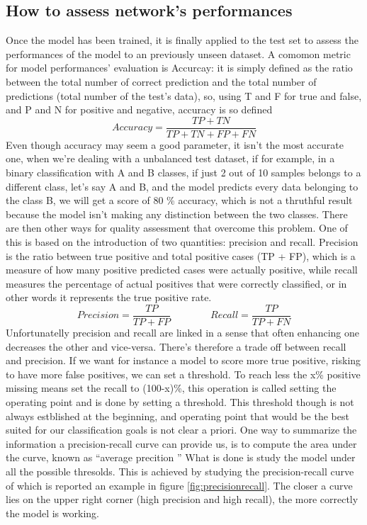 \documentclass[a4paper,11pt]{article}
\begin{document}
\subsection{How to assess network's performances}
Once the model has been trained, it is finally applied to the test set to assess the performances of the model to an previously unseen dataset.
A comomon metric for model performances' evaluation is Accurcay: it is simply defined as the ratio between the total number of correct prediction and the total number of predictions (total number of the test's data), so, using T and F for true and false, and P and N for positive and negative, accuracy is so defined
\begin{equation}
Accuracy = \frac{TP + TN}{TP+TN+FP+FN}
\end{equation}
Even though accuracy may seem a good parameter, it isn't the most accurate one, when we're dealing with a unbalanced test dataset, if for example, in a binary classification with A and B classes, if just 2 out of 10 samples belongs to a different class, let's say A and B, and the model predicts every data belonging to the class B, we will get a score of 80 \% accuracy, which is not a thruthful result because the model isn't making any distinction between the two classes.
There are then other ways for quality assessment that overcome this problem. One of this is based on the introduction of two quantities: precision and recall.
Precision is the ratio between true positive and total positive cases (TP + FP), which is a measure of how many positive predicted cases were actually positive, while recall measures the percentage of actual positives that were correctly classified, or in other words it represents the true positive rate.
\begin{equation}
Precision = \frac{TP}{TP+FP} \qquad \qquad Recall = \frac{TP}{TP+FN}
\end{equation}
Unfortunatelly precision and recall are linked in a sense that often enhancing one decreases the other and vice-versa.
There's therefore a trade off between recall and precision. If we want for instance a model to score more true positive, risking to have more false positives, we can set a threshold.
To reach less the x\% positive missing means set the recall to (100-x)\%, this operation is called setting the operating point and is done by setting a threshold.
This threshold though is not always estblished at the beginning, and operating point that would be the best suited for our classification goals is not clear a priori.
One way to summarize the information a precision-recall curve can provide us, is to compute the area under the curve, known as \textquotedblleft average precition \textquotedblright
What is done is study the model under all the possible thresolds.
This is achieved by studying the precision-recall curve of which is reported an example in figure \ref{fig:precisionrecall}.
The closer a curve lies on the upper right corner (high precision and high recall), the more correctly the model is working.
\end{document}

